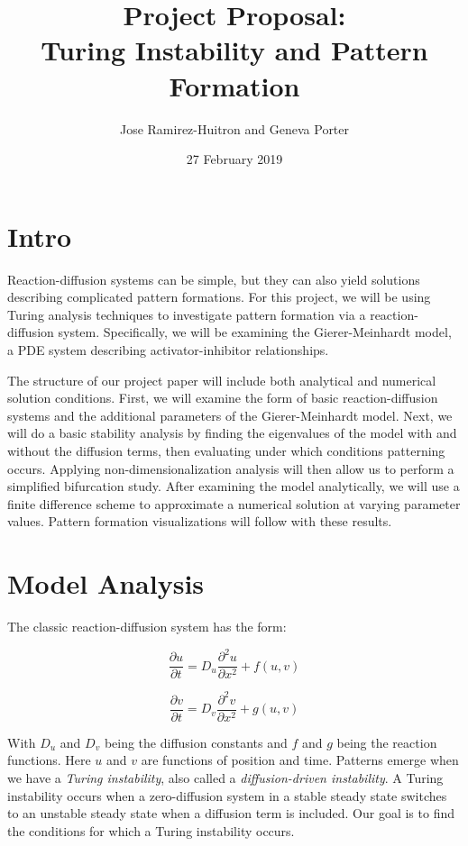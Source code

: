 \documentclass[12pt]{article}
\title{Project Proposal: \\ Turing Instability and Pattern Formation}
\author{Jose Ramirez-Huitron and Geneva Porter}
\date{27 February 2019}
\begin{document}
\maketitle

\vspace{3cm}

\section*{Intro}

Reaction-diffusion systems can be simple, but they can also yield solutions describing complicated pattern formations. For this project, we will be using Turing analysis techniques to investigate pattern formation via a reaction-diffusion system. Specifically, we will be examining the Gierer-Meinhardt model\cite{Gierer1972}, a PDE system describing activator-inhibitor relationships. 

The structure of our project paper will include both analytical and numerical solution conditions. First, we will examine the form of basic reaction-diffusion systems and the additional parameters of the Gierer-Meinhardt model. Next, we will do a basic stability analysis by finding the eigenvalues of the model with and without the diffusion terms, then evaluating under which conditions patterning occurs. Applying non-dimensionalization analysis will then allow us to perform a simplified bifurcation study. After examining the model analytically, we will use a finite difference scheme to approximate a numerical solution at varying parameter values. Pattern formation visualizations will follow with these results.

\pagebreak

\section*{Model Analysis}

The classic reaction-diffusion system has the form:

$$
\frac{\partial u}{\partial t}=D_u\frac{\partial^2u}{\partial x^2}+f(u,v)
$$

$$
\frac{\partial v}{\partial t}=D_v\frac{\partial^2v}{\partial x^2}+g(u,v)
$$

\vspace{3mm}

With $D_u$ and $D_v$ being the diffusion constants and $f$ and $g$ being the reaction functions. Here $u$ and $v$ are functions of position and time.  Patterns emerge when we have a {\it Turing instability}, also called a {\it diffusion-driven instability}\cite{ShapeOfMath}. A Turing instability occurs when a zero-diffusion system in a stable steady state switches to an unstable steady state when a diffusion term is included. Our goal is to find the conditions for which a Turing instability occurs. 
\end{document}
